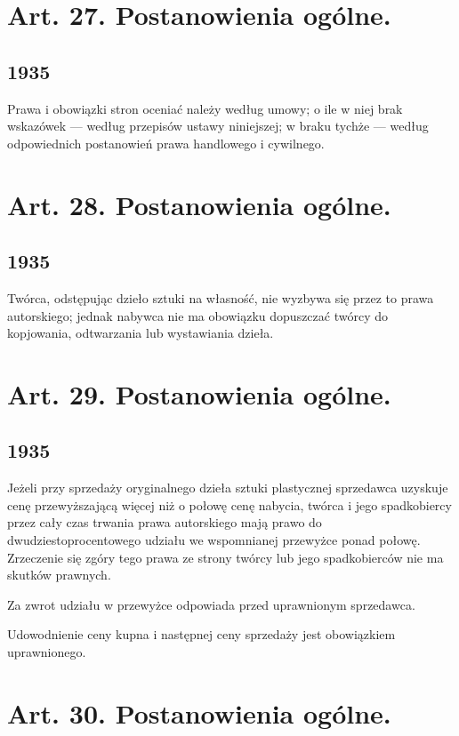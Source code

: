 \documentclass[withmarginpar]{book}
\begin{document}
\section{Art. 27. Postanowienia ogólne.}
\label{sec:art.-27}
\subsection{1935}
\label{sec:art.-27-1}

Prawa i obowiązki stron oceniać należy według umowy; o ile w niej brak
wskazówek — według przepisów ustawy niniejszej; w braku tychże —
według odpowiednich postanowień prawa handlowego i cywilnego.

\section{Art. 28. Postanowienia ogólne.}
\label{sec:art.-28}
\subsection{1935}
\label{sec:art.-28-1}

Twórca, odstępując dzieło sztuki na własność, nie wyzbywa się przez to
prawa autorskiego; jednak nabywca nie ma obowiązku dopuszczać twórcy
do kopjowania, odtwarzania lub wystawiania dzieła.

\section{Art. 29. Postanowienia ogólne.}
\label{sec:art.-29}
\subsection{1935}
\label{sec:art.-29-1}

Jeżeli przy sprzedaży oryginalnego dzieła sztuki plastycznej
sprzedawca uzyskuje cenę przewyższającą więcej niż o połowę cenę
nabycia, twórca i jego spadkobiercy przez cały czas trwania prawa
autorskiego mają prawo do dwudziestoprocentowego udziału we
wspomnianej przewyżce ponad połowę. Zrzeczenie się zgóry tego prawa ze
strony twórcy lub jego spadkobierców nie ma skutków prawnych.

Za zwrot udziału w przewyżce odpowiada przed uprawnionym sprzedawca.

Udowodnienie ceny kupna i następnej ceny sprzedaży jest obowiązkiem
uprawnionego.

\section{Art. 30. Postanowienia ogólne.}
\label{sec:art.-30}
\end{document}

